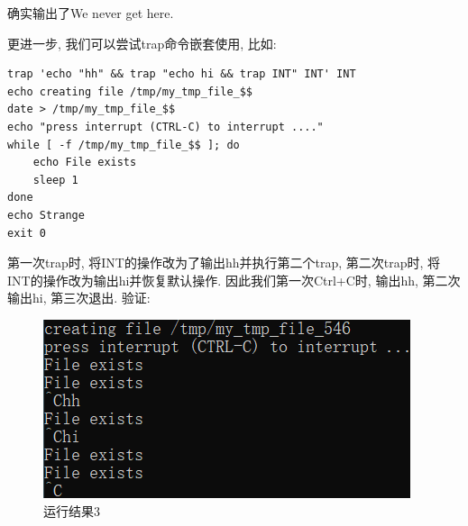 \documentclass[a4paper]{ctexart}
\begin{document}
确实输出了We never get here.

更进一步, 我们可以尝试trap命令嵌套使用, 比如:
\begin{verbatim}
trap 'echo "hh" && trap "echo hi && trap INT" INT' INT
echo creating file /tmp/my_tmp_file_$$
date > /tmp/my_tmp_file_$$
echo "press interrupt (CTRL-C) to interrupt ...."
while [ -f /tmp/my_tmp_file_$$ ]; do
    echo File exists
    sleep 1
done
echo Strange
exit 0
\end{verbatim}

第一次trap时, 将INT的操作改为了输出hh并执行第二个trap, 第二次trap时, 将INT的操作改为输出hi并恢复默认操作. 因此我们第一次Ctrl+C时, 输出hh, 第二次输出hi, 第三次退出. 验证:
\begin{figure}[htbp]
    \centering
    \includegraphics[scale=0.8]{HW2_截图3.png}
    \caption{运行结果3}
\end{figure} 








\end{document}
